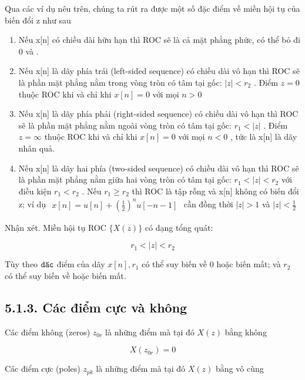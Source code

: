 \documentclass[
  10
]{article}
\begin{document}
Qua các ví dụ nêu trên, chúng ta rút ra được một số đặc điểm về miền hội
tụ của biến đổi z như sau

\begin{enumerate}
\def\labelenumi{(\roman{enumi})}
\item
  Nếu x{[}n{]} có chiều dài hữu hạn thì ROC sẽ là cả mặt phẳng phức, có
  thể bỏ đi 0 và .
\item
  Nếu x{[}n{]} là dãy phía trái (left-sided sequence) có chiều dài vô
  hạn thì ROC sẽ là phần mặt phẳng nằm trong vòng tròn có tâm tại gốc:
  \(| z | < r _ { 2 }\) . Điểm \(z = 0\) thuộc ROC khi và chỉ khi
  \(x [ n ] = 0\) với mọi \(n > 0\)
\item
  Nếu x{[}n{]} là dãy phía phải (right-sided sequence) có chiều dài vô
  hạn thì ROC sẽ là phần mặt phẳng nằm ngoài vòng tròn có tâm tại gốc:
  \(r _ { 1 } < | z |\) . Điểm \(z = \infty\) thuộc ROC khi và chỉ khi
  \(x [ n ] = 0\) với mọi \(n < 0\) , tức là x{[}n{]} là dãy nhân quả.
\item
  Nếu x{[}n{]} là dãy hai phía (two-sided sequence) có chiều dài vô hạn
  thì ROC sẽ là phần mặt phẳng nằm giữa hai vòng tròn có tâm tại gốc:
  \(r _ { 1 } < | z | < r _ { 2 }\) với điều kiện
  \(r _ { 1 } < r _ { 2 }\) . Nếu \(r _ { 1 } \geq r _ { 2 }\) thì ROC
  là tập rỗng và x{[}n{]} không có biến đổi z; ví dụ
  \(\begin{array} { r } { x [ n ] = u [ n ] + \left( \frac { 1 } { 2 } \right) ^ { n } u [ - n - 1 ] } \end{array}\)
  cần đồng thời \(| z | > 1\) và
  \(\vert z \vert < { \frac { 1 } { 2 } }\)
\end{enumerate}

Nhận xét. Miền hội tụ ROC \(\{ X ( z ) \}\) có dạng tổng quát:

\[
r _ {1} <   | z | <   r _ {2}\tag{5.7}
\]

Tùy theo \(\tt d \breve { a } c\) điểm của dãy \(x [ n ] , r _ { 1 }\)
có thể suy biến về 0 hoặc biến mất; và \(r _ { 2 }\) có thể suy biến về
hoặc biến mất.

\subsection{5.1.3. Các điểm cực và
không}\label{cuxe1c-ux111iux1ec3m-cux1ef1c-vuxe0-khuxf4ng}

Các điểm không (zeros) \(z _ { 0 r }\) là những điểm mà tại đó
\(X ( z )\) bằng không

\[
X (z _ {0 r}) = 0
\]

Các điểm cực (poles) \(z _ { p k }\) là những điểm mà tại đó \(X ( z )\)
bằng vô cùng
\end{document}
